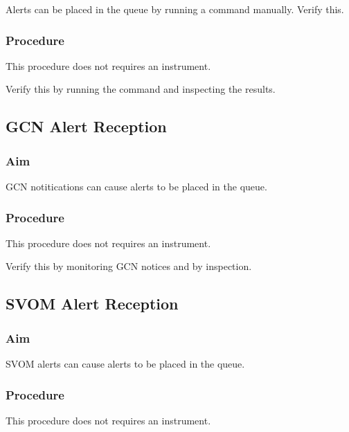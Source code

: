 \documentclass{article}
\begin{document}
Alerts can be placed in the queue by running a command manually. Verify this.

\subsubsection{Procedure}

This procedure does not requires an instrument.

Verify this by running the command and inspecting the results.


\subsection{GCN Alert Reception}

\subsubsection{Aim}

GCN notitications can cause alerts to be placed in the queue.

\subsubsection{Procedure}

This procedure does not requires an instrument.

Verify this by monitoring GCN notices and by inspection.


\subsection{SVOM Alert Reception}

\subsubsection{Aim}

SVOM alerts can cause alerts to be placed in the queue.

\subsubsection{Procedure}

This procedure does not requires an instrument.
\end{document}
